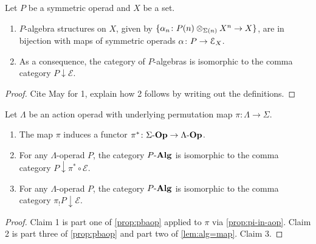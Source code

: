 \begin{lem}\label{lem:alg=map}
 Let $P$ be a symmetric operad and $X$ be a set.
\begin{enumerate}
\item $P$-algebra structures on $X$, given by $\{ \alpha_n \colon  P(n) \otimes_{\Sigma(n)} X^{n} \rightarrow X\}$, are in bijection with maps of symmetric operads $\alpha \colon P \to \mathcal{E}_X$.
\item As a consequence, the category of $P$-algebras is isomorphic to the comma category $P \downarrow \mathcal{E}$.
\end{enumerate}
\end{lem}
\begin{proof}
Cite May for 1, explain how 2 follows by writing out the definitions.
\end{proof}

\begin{cor}\label{cor:pi-star}
Let $\Lambda$ be an action operad with underlying permutation map $\pi \colon \Lambda \to \Sigma$. 
\begin{enumerate}
\item The map $\pi$ induces a functor $\pi^* \colon \Sigma\mbox{-}\mathbf{Op} \to \Lambda\mbox{-}\mathbf{Op}$.
\item For any $\Lambda$-operad $P$, the category $P\mbox{-}\mathbf{Alg}$ is isomorphic to the comma category $P \downarrow \pi^* \circ \mathcal{E}$.
\item For any $\Lambda$-operad $P$, the category $P\mbox{-}\mathbf{Alg}$ is isomorphic to the comma category $\pi_{!}P \downarrow \mathcal{E}$.
\end{enumerate}
\end{cor}
\begin{proof}
Claim 1 is part one of \cref{prop:pbaop} applied to $\pi$ via \cref{prop:pi-in-aop}.
Claim 2 is part three of \cref{prop:pbaop} and part two of \cref{lem:alg=map}.
Claim 3.
\end{proof}

